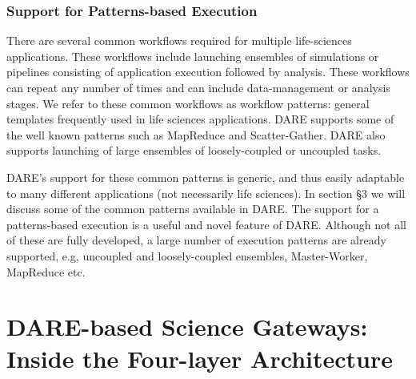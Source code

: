 \documentclass[]{svjour3}
\begin{document}
\subsubsection{Support for Patterns-based Execution}

There are several common workflows required for multiple life-sciences
applications. These workflows include launching ensembles of simulations
or pipelines consisting of application execution followed by analysis.
These workflows can repeat any number of times and can include
data-management or analysis stages. We refer to these common workflows
as workflow patterns: general templates frequently used in life sciences
applications. DARE supports some of the well known patterns such as MapReduce
and Scatter-Gather. DARE also supports launching of large ensembles
of loosely-coupled or uncoupled tasks.


DARE's support for these common patterns is generic, and thus easily
adaptable to many different applications (not necessarily life sciences).
In section \S3 we will discuss some of the common patterns available
in DARE. The support for a patterns-based execution is a useful and novel
feature of DARE. Although not all of these are fully developed,
a large number of execution patterns are already supported, e.g,
uncoupled and loosely-coupled ensembles, Master-Worker, MapReduce etc.

\section{DARE-based Science Gateways: Inside the Four-layer
  Architecture}

\end{document}
